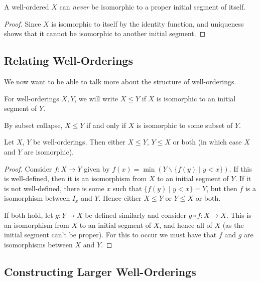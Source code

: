 \documentclass[a4paper, 10pt, twocolumn]{amsart}
\begin{document}
\begin{corollary}
  A well-ordered $X$ can \emph{never} be isomorphic to a proper initial segment of itself.
\end{corollary}
\begin{proof}
  Since $X$ is isomorphic to itself by the identity function, and uniqueness shows that it cannot be isomorphic to another initial segment.
\end{proof}

\subsection{Relating Well-Orderings}

We now want to be able to talk more about the structure of well-orderings.

\begin{definition}
  For well-orderings $X, Y$, we will write $X \leq Y$ if $X$ is isomorphic to an initial segment of $Y$.
\end{definition}

By subset collapse, $X \leq Y$ if and only if $X$ is isomorphic to some subset of $Y$.

\begin{proposition}[Trichotomy]
  Let $X$, $Y$ be well-orderings. Then either $X \leq Y$, $Y \leq X$ or both (in which case $X$ and $Y$ are isomorphic). 
\end{proposition}
\begin{proof}
  Consider $f: X \rightarrow Y$ given by $f(x) = \min (Y \backslash \{f(y) \mid y < x\})$. If this is well-defined, then it is an isomorphism from $X$ to an initial segment of $Y$. If it is not well-defined, there is some $x$ such that $\{f(y) \mid y < x\} = Y$, but then $f$ is a isomorphism between $I_x$ and $Y$. Hence either $X \leq Y$ or $Y \leq X$ or both. 

If both hold, let $g: Y \rightarrow X$ be defined similarly and consider $g \circ f: X \rightarrow X$. This is an isomorphism from $X$ to an initial segment of $X$, and hence all of $X$ (as the initial segment can't be proper). For this to occur we must have that $f$ and $g$ are isomorphisms between $X$ and $Y$.
\end{proof}


\subsection{Constructing Larger Well-Orderings}
\end{document}
